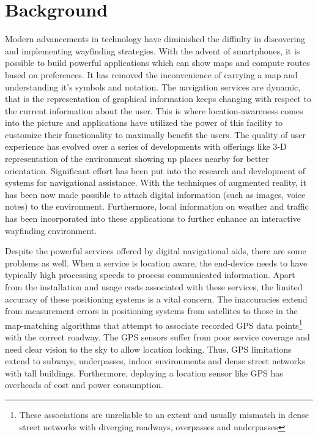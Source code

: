 \documentclass{iitkthesis}
\begin{document}
\section{Background}
Modern advancements in technology have diminished the diffiulty 
in discovering and implementing wayfinding strategies. With the 
advent of smartphones, it is possible to build powerful 
applications which can show maps and compute routes based on preferences. 
It has removed the inconvenience of carrying a map and understanding it's 
symbols and notation. The navigation services are dynamic, that is the 
representation of graphical information keeps changing with respect to 
the current information about the user. This is where location-awareness 
comes into the picture and applications have utilized the power of this 
facility to customize their functionality to maximally benefit the users. 
The quality of user experience has evolved over a series of developments 
with offerings like 3-D representation of the environment showing up 
places nearby for better orientation. Significant effort has been put 
into the research and development of systems for navigational 
assistance. With the techniques of augmented reality, it has been now 
made possible to attach digital information (such as images, voice notes) 
to the environment. Furthermore, local information on weather and traffic 
has been incorporated into these applications to further enhance an 
interactive wayfinding environment.

Despite the powerful services offered by digital navigational aids, there 
are some problems as well. When a service is location aware, 
the end-device needs to have typically high processing speeds to process 
communicated information. Apart from 
the installation and usage costs associated with these services, the 
limited accuracy of these positioning systems is a vital concern. The 
inaccuracies extend from measurement errors in positioning systems from 
satellites to those in the map-matching algorithms \cite{white2000} that 
attempt to associate recorded GPS data points\footnote{These associations 
are unreliable to an extent and usually mismatch in dense street networks 
with diverging roadways, overpasses and underpasses} with the correct 
roadway. The GPS sensors suffer from poor service coverage and need clear 
vision to the sky to allow location locking. Thus, GPS limitations extend 
to subways, underpasses, indoor environments and dense street networks 
with tall buildings. Furthermore, deploying a location sensor like GPS 
has overheads of cost and power consumption.
\end{document}
